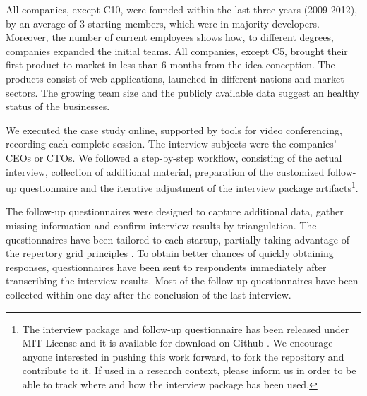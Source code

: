 \documentclass[10pt,journal,letterpaper,compsoc]{IEEEtran}
\begin{document}
All companies, except C10, were founded within the last three years (2009-2012), 
by an average of 3 starting members, which were in majority developers. 
Moreover, the number of current employees shows how, to different degrees, 
companies expanded the initial teams. All companies, except C5, brought their 
first product to market in less than 6 months from the idea conception. The 
products consist of web-applications, launched in different nations and market 
sectors. The growing team size and the publicly available data suggest an 
healthy status of the businesses.

We executed the case study online, supported by tools for video conferencing, 
recording each complete session. The interview subjects were the companies' CEOs 
or CTOs. We followed a step-by-step workflow, consisting of the actual 
interview, collection of additional material, preparation of the customized 
follow-up questionnaire and the iterative adjustment of the interview package 
artifacts\footnote{The interview package and follow-up questionnaire has been 
released under MIT License \cite{MITLicense} and it is available for download on 
Github \cite{GitHubInterviewPackage}. We encourage anyone interested in pushing 
this work forward, to fork the repository and contribute to it. If used in a 
research context, please inform us in order to be able to track where and how 
the interview package has been used.}.

The follow-up questionnaires were designed to capture additional data, gather 
missing information and confirm interview results by triangulation. The 
questionnaires have been tailored to each startup, partially taking advantage of 
the repertory grid principles \cite{Edwards2009}. To obtain better chances of 
quickly obtaining responses, questionnaires have been sent to respondents 
immediately after transcribing the interview results. Most of the follow-up  
questionnaires have been collected within one day after the conclusion of the 
last interview.   

\end{document}
